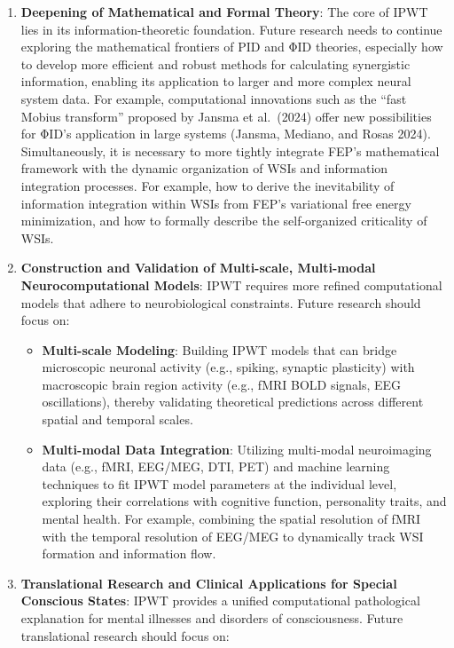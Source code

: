 \documentclass[
  a4paper]{article}
\providecommand{\tightlist}{%
  \setlength{\itemsep}{0pt}\setlength{\parskip}{0pt}}
\begin{document}
\begin{enumerate}
\def\labelenumi{\arabic{enumi}.}
\item
  \textbf{Deepening of Mathematical and Formal Theory}: The core of IPWT
  lies in its information-theoretic foundation. Future research needs to
  continue exploring the mathematical frontiers of PID and ΦID theories,
  especially how to develop more efficient and robust methods for
  calculating synergistic information, enabling its application to
  larger and more complex neural system data. For example, computational
  innovations such as the ``fast Mobius transform'' proposed by Jansma
  et al.~(2024) offer new possibilities for ΦID's application in large
  systems (Jansma, Mediano, and Rosas 2024). Simultaneously, it is
  necessary to more tightly integrate FEP's mathematical framework with
  the dynamic organization of WSIs and information integration
  processes. For example, how to derive the inevitability of information
  integration within WSIs from FEP's variational free energy
  minimization, and how to formally describe the self-organized
  criticality of WSIs.
\item
  \textbf{Construction and Validation of Multi-scale, Multi-modal
  Neurocomputational Models}: IPWT requires more refined computational
  models that adhere to neurobiological constraints. Future research
  should focus on:

  \begin{itemize}
  \tightlist
  \item
    \textbf{Multi-scale Modeling}: Building IPWT models that can bridge
    microscopic neuronal activity (e.g., spiking, synaptic plasticity)
    with macroscopic brain region activity (e.g., fMRI BOLD signals, EEG
    oscillations), thereby validating theoretical predictions across
    different spatial and temporal scales.
  \item
    \textbf{Multi-modal Data Integration}: Utilizing multi-modal
    neuroimaging data (e.g., fMRI, EEG/MEG, DTI, PET) and machine
    learning techniques to fit IPWT model parameters at the individual
    level, exploring their correlations with cognitive function,
    personality traits, and mental health. For example, combining the
    spatial resolution of fMRI with the temporal resolution of EEG/MEG
    to dynamically track WSI formation and information flow.
  \end{itemize}
\item
  \textbf{Translational Research and Clinical Applications for Special
  Conscious States}: IPWT provides a unified computational pathological
  explanation for mental illnesses and disorders of consciousness.
  Future translational research should focus on:


\end{enumerate}
\end{document}
